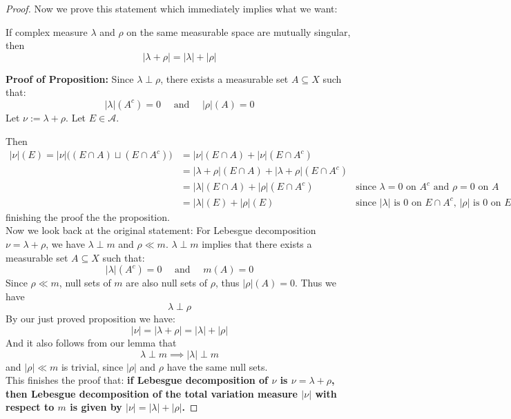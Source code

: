 \documentclass[lang=cn,11pt]{elegantbook}
\begin{document}
\begin{proof}
Now we prove this statement which immediately implies what we want: 
\begin{proposition}
    If complex measure \(\lambda\) and \(\rho\) on the same measurable space are mutually singular, then \[
|\lambda+\rho|=|\lambda|+|\rho|
\]
\end{proposition}
\noindent \textbf{Proof of Proposition:}  Since $\lambda \perp \rho$, there exists a measurable set $A \subseteq X$ such that:
$$
|\lambda|\left(A^c\right)=0 \quad \text { and } \quad|\rho|(A)=0 
$$
Let $\nu:=\lambda+\rho$. Let $E \in \mathcal{A}$. 

Then
\begin{align}
    |\nu |(E) = |\nu |\big((E\cap A) \sqcup (E \cap A^c) \big) &= |\nu| (E\cap A) +  |\nu| (E\cap A^c)\\
    & = |\lambda+\rho|  (E\cap A) +  |\lambda+\rho| (E\cap A^c) \\
    &= |\lambda|  (E\cap A) +  |\rho| (E\cap A^c)   \quad &\text{since $\lambda = 0$  on $A^c$ and $\rho = 0$ on $A$} \\
    & =  |\lambda|  (E ) +  |\rho| (E) \quad &\text{since $|\lambda|$ is  $0$ on $E\cap A^c$, $|\rho|$ is  $0$ on $E\cap A$}
\end{align}
finishing the proof the the proposition.\\
Now we look back at the original statement: For Lebesgue decomposition $\nu=\lambda+\rho$, we have $\lambda\perp m$ and $\rho\ll m$. 
$\lambda\perp m$ implies that  there exists a measurable set $A \subseteq X$ such that:
$$
|\lambda |(A^c) =0 \quad \text { and } \quad m (A)=0 
$$
Since $\rho\ll m$, null sets of $m$ are also null sets of $\rho$, thus $|\rho|(A) = 0$. Thus we have \[
\lambda \perp \rho
\]
By our just proved proposition we have:  $$|\nu|=|\lambda + \rho| = |\lambda|+|\rho|$$And it also follows from our lemma that \[
\lambda \perp m \implies |\lambda|\perp m
\]
and $|\rho|\ll m$ is trivial, since $|\rho|$ and $\rho$ have the same null sets.\\
This finishes the proof that: \textbf{if Lebesgue decomposition of $\nu$ is $\nu = \lambda + \rho$, then Lebesgue decomposition of the total variation measure $|\nu|$ with respect to $m$ is given by $|\nu|=|\lambda|+|\rho|$. }
\end{proof}
\end{document}
